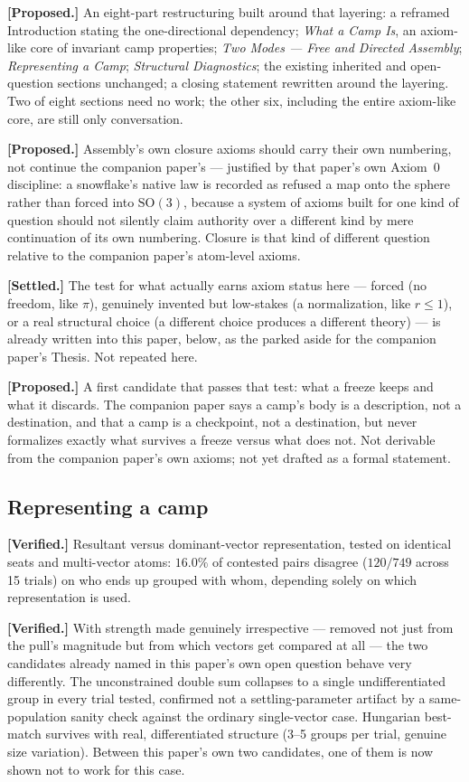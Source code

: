 \documentclass[12pt, a4paper]{article}
\begin{document}
\textbf{[Proposed.]} An eight-part restructuring built around that
layering: a reframed Introduction stating the one-directional
dependency; \emph{What a Camp Is}, an axiom-like core of invariant
camp properties; \emph{Two Modes --- Free and Directed Assembly};
\emph{Representing a Camp}; \emph{Structural Diagnostics}; the
existing inherited and open-question sections unchanged; a closing
statement rewritten around the layering. Two of eight sections need
no work; the other six, including the entire axiom-like core, are
still only conversation.

\textbf{[Proposed.]} Assembly's own closure axioms should carry
their own numbering, not continue the companion paper's --- justified
by that paper's own Axiom~0 discipline: a snowflake's native law is
recorded as refused a map onto the sphere rather than forced into
$\mathrm{SO}(3)$, because a system of axioms built for one kind of
question should not silently claim authority over a different kind
by mere continuation of its own numbering. Closure is that kind of
different question relative to the companion paper's atom-level
axioms.

\textbf{[Settled.]} The test for what actually earns axiom status
here --- forced (no freedom, like $\pi$), genuinely invented but
low-stakes (a normalization, like $r\le1$), or a real structural
choice (a different choice produces a different theory) --- is
already written into this paper, below, as the parked aside for the
companion paper's Thesis. Not repeated here.

\textbf{[Proposed.]} A first candidate that passes that test: what a
freeze keeps and what it discards. The companion paper says a
camp's body is a description, not a destination, and that a camp is
a checkpoint, not a destination, but never formalizes exactly what
survives a freeze versus what does not. Not derivable from the
companion paper's own axioms; not yet drafted as a formal statement.

\subsection*{Representing a camp}

\textbf{[Verified.]} Resultant versus dominant-vector representation,
tested on identical seats and multi-vector atoms: $16.0\%$ of contested pairs
disagree ($120/749$ across 15 trials) on who ends up grouped with
whom, depending solely on which representation is used.

\textbf{[Verified.]} With strength made genuinely irrespective ---
removed not just from the pull's magnitude but from which vectors
get compared at all --- the two candidates already named in this
paper's own open question behave very differently. The unconstrained
double sum collapses to a single undifferentiated group in every
trial tested, confirmed not a settling-parameter artifact by a
same-population sanity check against the ordinary single-vector case.
Hungarian best-match survives with real, differentiated structure
(3--5 groups per trial, genuine size variation). Between this
paper's own two candidates, one of them is now shown not to work for
this case.
\end{document}
